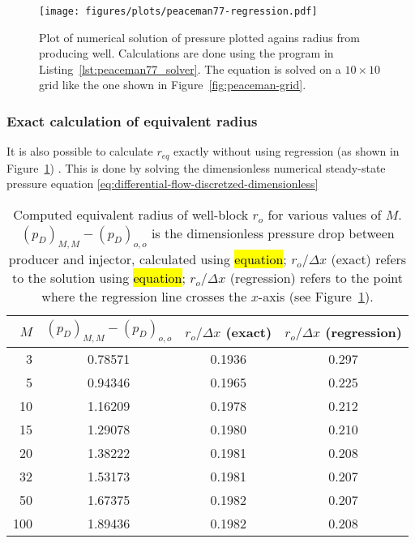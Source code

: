 \begin{figure}[htbp]
    \centering
    \texttt{[image: figures/plots/peaceman77-regression.pdf]}
    \caption{Plot of numerical solution of pressure plotted agains radius from producing well. Calculations are done using the program in Listing~\ref{lst:peaceman77_solver}. The equation is solved on a $10\times 10$ grid like the one shown in Figure~\ref{fig:peaceman-grid}.}
    \label{fig:peaceman77_pressure_vs_radius}
\end{figure}






\subsubsection{Exact calculation of equivalent radius} %
\label{ssub:exact_calculation_of_equivalent_radius}
It is also possible to calculate $r_{eq}$ exactly without using regression (as shown in Figure~\ref{fig:peaceman77_pressure_vs_radius}) \cite{Peaceman1978Interpretation}. This is done by solving the dimensionless numerical steady-state pressure equation \eqref{eq:differential-flow-discretzed-dimensionless}


\begin{table}
    \centering
    \caption{Computed equivalent radius of well-block $r_o$ for various values of $M$. $(p_D)_{M,M} - (p_D)_{o,o}$ is the dimensionless pressure drop between producer and injector, calculated using \hl{equation}; $r_o/\Delta x$ (exact) refers to the solution using \hl{equation}; $r_o / \Delta x$ (regression) refers to the point where the regression line crosses the $x$-axis (see Figure~\ref{fig:peaceman77_pressure_vs_radius}).}
    \begin{tabular}{rccc}
        \toprule
        $M$ & $(p_D)_{M,M} - (p_D)_{o,o}$ & $r_o/\Delta x$ (exact) & $r_o / \Delta x$ (regression)\\
        \midrule
        3   & 0.78571 & 0.1936 & 0.297 \\
        5   & 0.94346 & 0.1965 & 0.225 \\
        10  & 1.16209 & 0.1978 & 0.212 \\
        15  & 1.29078 & 0.1980 & 0.210 \\
        20  & 1.38222 & 0.1981 & 0.208 \\
        32  & 1.53173 & 0.1981 & 0.207 \\
        50  & 1.67375 & 0.1982 & 0.207 \\
        100 & 1.89436 & 0.1982 & 0.208 \\
        \bottomrule
    \end{tabular}
    \label{tbl:peaceman-results}
\end{table}

